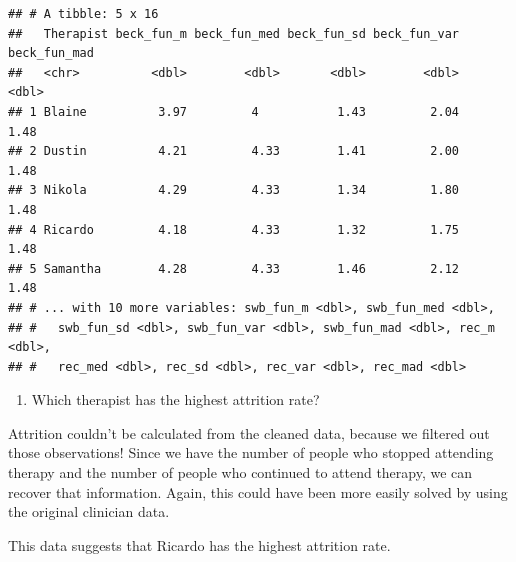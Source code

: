 \documentclass[]{book}
\newenvironment{Shaded}{\begin{snugshade}}{\end{snugshade}}
\newcommand{\CommentTok}[1]{\textcolor[rgb]{0.56,0.35,0.01}{\textit{#1}}}
\newcommand{\DataTypeTok}[1]{\textcolor[rgb]{0.13,0.29,0.53}{#1}}
\newcommand{\KeywordTok}[1]{\textcolor[rgb]{0.13,0.29,0.53}{\textbf{#1}}}
\newcommand{\NormalTok}[1]{#1}
\newcommand{\OperatorTok}[1]{\textcolor[rgb]{0.81,0.36,0.00}{\textbf{#1}}}
\newcommand{\StringTok}[1]{\textcolor[rgb]{0.31,0.60,0.02}{#1}}
\providecommand{\tightlist}{%
  \setlength{\itemsep}{0pt}\setlength{\parskip}{0pt}}
\theoremstyle{definition}
\theoremstyle{definition}
\theoremstyle{definition}
\theoremstyle{remark}
\begin{document}
\begin{verbatim}
## # A tibble: 5 x 16
##   Therapist beck_fun_m beck_fun_med beck_fun_sd beck_fun_var beck_fun_mad
##   <chr>          <dbl>        <dbl>       <dbl>        <dbl>        <dbl>
## 1 Blaine          3.97         4           1.43         2.04         1.48
## 2 Dustin          4.21         4.33        1.41         2.00         1.48
## 3 Nikola          4.29         4.33        1.34         1.80         1.48
## 4 Ricardo         4.18         4.33        1.32         1.75         1.48
## 5 Samantha        4.28         4.33        1.46         2.12         1.48
## # ... with 10 more variables: swb_fun_m <dbl>, swb_fun_med <dbl>,
## #   swb_fun_sd <dbl>, swb_fun_var <dbl>, swb_fun_mad <dbl>, rec_m <dbl>,
## #   rec_med <dbl>, rec_sd <dbl>, rec_var <dbl>, rec_mad <dbl>
\end{verbatim}

\begin{enumerate}
\def\labelenumi{\arabic{enumi}.}
\setcounter{enumi}{2}
\tightlist
\item
  Which therapist has the highest attrition rate?
\end{enumerate}

Attrition couldn't be calculated from the cleaned data, because we filtered out those observations! Since we have the number of people who stopped attending therapy and the number of people who continued to attend therapy, we can recover that information. Again, this could have been more easily solved by using the original clinician data.

This data suggests that Ricardo has the highest attrition rate.

\begin{Shaded}
\end{Shaded}
\end{document}
